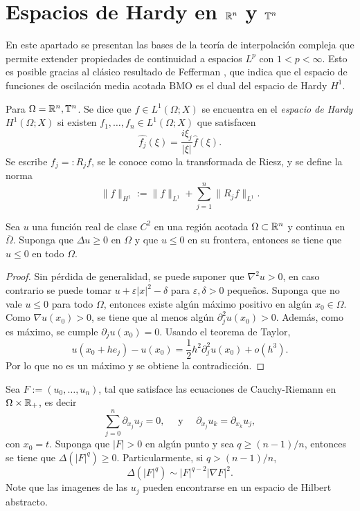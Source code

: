 \section{Espacios de Hardy en $\mathbb{R}^n$ y $\mathbb{T}^n$}
En este apartado se presentan las bases de la teoría de interpolación compleja que permite extender propiedades de continuidad a espacios $L^p$ con $1<p<\infty$. Esto es posible gracias al clásico resultado de Fefferman \cite{fefferman-BMO}, que indica que el espacio de funciones de oscilación media acotada $\mathrm{BMO}$ es el dual del espacio de Hardy $H^1$. 
\begin{definition}
	Para $\Omega = \mathbb{R}^n, \mathbb{T}^n$. Se dice que $f\in L^1(\Omega;X)$ se encuentra en el \textit{espacio de Hardy} $H^1(\Omega;X)$ si existen $f_1,\ldots,f_n\in L^1(\Omega;X)$ que satisfacen
	\begin{equation*}
		\widehat{f_j} (\xi)= \frac{i\xi_j}{|\xi|}\widehat{f}(\xi).
	\end{equation*}
	Se escribe $f_j=:R_jf$, se le conoce como la transformada de Riesz, y se define la norma 
	\begin{equation*}
		\|f\|_{H^1} := \|f\|_{L^1} + \sum_{j=1}^n \|R_jf\|_{L^1}.
	\end{equation*}
\end{definition}
\begin{proposition}
	Sea $u$ una función real de clase $C^2$ en una región acotada $\Omega\subset\mathbb{R}^n$ y continua en $\overline{\Omega}$. Suponga que $\Delta u \geq 0$ en $\Omega$ y que $u\leq0$ en su frontera, entonces se tiene que $u\leq 0$ en todo $\Omega$. 
\end{proposition}
\begin{proof}
	Sin pérdida de generalidad, se puede suponer que $\nabla^2 u > 0$, en caso contrario se puede tomar $u+\varepsilon|x|^2 - \delta$ para $\varepsilon,\delta>0$ pequeños. Suponga que no vale $u\leq 0$ para todo $\Omega$, entonces existe algún máximo positivo en algún $x_0\in\Omega$. Como $\nabla u(x_0) >0$, se tiene que al menos algún $\partial^2_j u(x_0) > 0$. Además, como es máximo, se cumple $\partial_j u(x_0) = 0$. Usando el teorema de Taylor,
	\begin{equation*}
		u(x_0+he_j) - u(x_0) = \frac{1}{2} h^2\partial^2_j u(x_0) + o(h^3).
	\end{equation*}
	Por lo que no es un máximo y se obtiene la contradicción.
\end{proof}
\begin{lemma}\label{lem:subharmonic-gradient}
	Sea $F:=(u_0,\ldots,u_n)$, tal que satisface las ecuaciones de Cauchy-Riemann en $\Omega\times\mathbb{R}_+$, es decir 
	\begin{equation*}
		\sum_{j=0}^n \partial_{x_j}u_j = 0, \quad \text{ y } \quad \partial_{x_j}u_k = \partial_{x_k}u_j,
	\end{equation*}
	con $x_0=t$.  Suponga que $|F|>0$ en algún punto y sea $q\geq(n-1)/n$, entonces se tiene que $\Delta(|F|^q) \geq 0$. Particularmente, si $q>(n-1)/n$, 
	\begin{equation*}
		\Delta(|F|^q) \sim |F|^{q-2}|\nabla F|^2.
	\end{equation*}
	Note que las imagenes de las $u_j$ pueden encontrarse en un espacio de Hilbert abstracto.
\end{lemma}
